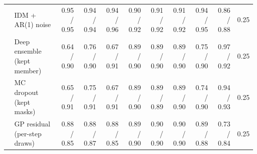 \begin{longtable}{llrrrrrrrrr}
 & IDM + AR(1) noise & 0.95 / 0.95 & 0.94 / 0.94 & 0.94 / 0.96 & 0.90 / 0.92 & 0.91 / 0.92 & 0.91 / 0.92 & 0.94 / 0.95 & 0.86 / 0.88 & 0.25 \\
 & Deep ensemble (kept member) & 0.64 / 0.90 & 0.76 / 0.90 & 0.67 / 0.91 & 0.89 / 0.90 & 0.89 / 0.90 & 0.89 / 0.90 & 0.75 / 0.90 & 0.97 / 0.92 & 0.25 \\
 & MC dropout (kept masks) & 0.65 / 0.91 & 0.75 / 0.91 & 0.67 / 0.91 & 0.89 / 0.90 & 0.89 / 0.89 & 0.89 / 0.90 & 0.74 / 0.90 & 0.94 / 0.93 & 0.25 \\
 & GP residual (per-step draws) & 0.88 / 0.85 & 0.88 / 0.87 & 0.88 / 0.85 & 0.89 / 0.90 & 0.90 / 0.90 & 0.90 / 0.90 & 0.89 / 0.88 & 0.73 / 0.84 & 0.25 \\
\end{longtable}
\endgroup
